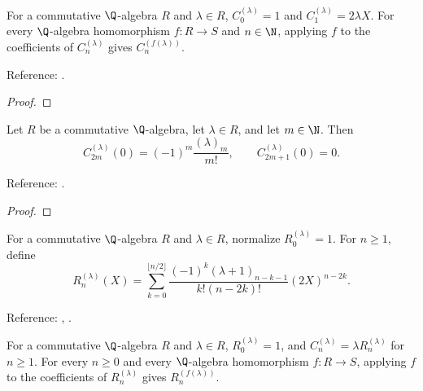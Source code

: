 \begin{supporting}

\begin{theorem}
\label{thm:gegenbauer-low-degree}
\leanok
For a commutative $\Q$-algebra $R$ and $\lambda\in R$,
$C_0^{(\lambda)}=1$ and $C_1^{(\lambda)}=2\lambda X$. For every $\Q$-algebra
homomorphism $f:R\to S$ and $n\in\N$, applying $f$ to the coefficients of
$C_n^{(\lambda)}$ gives $C_n^{(f(\lambda))}$.

Reference: \cite[18.5.10]{dlmf}.
\end{theorem}
\begin{proof}
\leanok
\end{proof}

\begin{theorem}
\label{thm:gegenbauer-values-zero}
\leanok
Let $R$ be a commutative $\Q$-algebra, let $\lambda\in R$, and let $m\in\N$. Then
\[C_{2m}^{(\lambda)}(0)=(-1)^m\frac{(\lambda)_m}{m!},\qquad
C_{2m+1}^{(\lambda)}(0)=0.\]


Reference: \cite[Table 18.6.1]{dlmf}.
\end{theorem}
\begin{proof}
\leanok
\end{proof}

\begin{definition}
\label{def:gegenbauer-reduced}
\leanok
For a commutative $\Q$-algebra $R$ and $\lambda\in R$, normalize
$R_0^{(\lambda)}=1$. For $n\ge1$, define
\[R_n^{(\lambda)}(X)=\sum_{k=0}^{\lfloor n/2\rfloor}
 \frac{(-1)^k(\lambda+1)_{n-k-1}}{k!(n-2k)!}(2X)^{n-2k}.\]

Reference: \cite[18.5.10]{dlmf}, \cite[\S18.7(iii)]{dlmf}.
\end{definition}

\begin{theorem}
\label{thm:gegenbauer-reduced-factor}
\leanok
For a commutative $\Q$-algebra $R$ and $\lambda\in R$,
$R_0^{(\lambda)}=1$, and $C_n^{(\lambda)}=\lambda R_n^{(\lambda)}$ for $n\ge1$.
For every $n\ge0$ and every $\Q$-algebra homomorphism $f:R\to S$, applying $f$ to the coefficients of $R_n^{(\lambda)}$ gives
$R_n^{(f(\lambda))}$.


\end{theorem}
\end{supporting}
